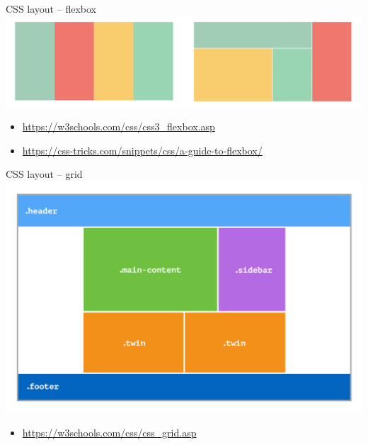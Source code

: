 \documentclass{beamer}
\begin{document}
\begin{frame}{CSS layout -- flexbox}
	  \includegraphics[scale=0.5]{css-flexbox}
	\begin{itemize}
		\item \url{https://w3schools.com/css/css3_flexbox.asp}
		\item \url{https://css-tricks.com/snippets/css/a-guide-to-flexbox/}
	\end{itemize}
\end{frame}

\begin{frame}{CSS layout -- grid}
	  \includegraphics[scale=0.15]{css-grid}
	\begin{itemize}
		\item \url{https://w3schools.com/css/css_grid.asp}
	\end{itemize}
\end{frame}
\end{document}
